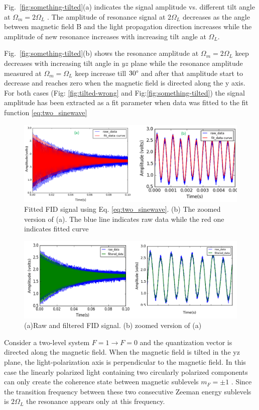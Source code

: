 Fig.~\ref{fig:something-tilted}(a) indicates the signal amplitude vs. different tilt angle at $\Omega_m=2\Omega_L$ . The amplitude of resonance signal at $2\Omega_L$  decreases as the angle between magnetic field B and the light propagation direction increases while the amplitude of new resonance  increases with increasing tilt angle at $\Omega_L$.
      
Fig.~\ref{fig:something-tilted}(b) shows the resonance amplitude at $\Omega_m=2\Omega_L$ keep decreases with increasing tilt angle in $yz$ plane while  the resonance amplitude measured at $\Omega_m=\Omega_L$ keep increase till $30\degree$ and after that amplitude start to decrease and reaches zero when the magnetic field is directed along the y axis. For both cases (Fig: \ref{fig:tilted-wrong} and Fig:\ref{fig:something-tilted}) the signal amplitude has been extracted as a fit parameter when data was fitted to the fit function \ref{eq:two_sinewave}
\begin{figure}[h]
\centering\includegraphics[width=0.9\linewidth]{figures/fitted_data_tilted_field.png}
\caption{ Fitted FID signal using Eq. \ref{eq:two_sinewave}. (b)  The zoomed version of (a). The  blue line indicates raw data while the red one indicates fitted curve}
\end{figure}
\begin{figure}[h]
\centering\includegraphics[width=0.9\linewidth]{figures/filtered_data.png}
\caption{(a)Raw and filtered FID signal. (b) zoomed version of (a)}
\end{figure}

Consider a two-level system $F=1\rightarrow F=0$ and the quantization vector is directed along the magnetic field. When the magnetic field is tilted in the yz plane, the light-polarization axis is perpendicular to the magnetic field. In this case the linearly polarized light containing two circularly polarized components can only create the coherence state between magnetic sublevels $m_F=\pm 1$ . Since the transition frequency between these two consecutive Zeeman energy sublevels is $2\Omega_L$  the resonance appears only at this frequency. 

